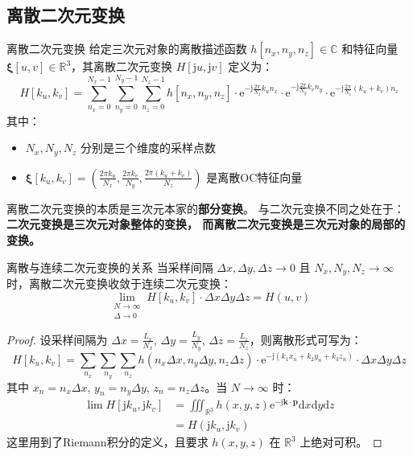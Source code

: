 \documentclass[lang=cn,newtx,10pt,scheme=chinese]{elegantbook}
\newcommand{\md}{\mathrm{d}}
\newcommand{\me}{\mathrm{e}}
\newcommand{\mj}{\mathrm{j}}
\begin{document}
\subsection{离散二次元变换}
\begin{definition}{离散二次元变换}
    给定三次元对象的离散描述函数 $h[n_x,n_y,n_z] \in \mathbb{C}$ 和特征向量 $\bm{\xi}[u,v] \in \mathbb{R}^3$，其离散二次元变换 $H[\mj u, \mj v]$ 定义为：
    \[
        H[k_u, k_v] = \sum_{n_x=0}^{N_x-1} \sum_{n_y=0}^{N_y-1} \sum_{n_z=0}^{N_z-1} h[n_x,n_y,n_z] \cdot \me^{-\mj \frac{2\pi}{N_x} k_u n_x} \cdot \me^{-\mj \frac{2\pi}{N_y} k_v n_y} \cdot \me^{-\mj \frac{2\pi}{N_z} (k_u+k_v) n_z}
    \]
    其中：
    \begin{itemize}
        \item $N_x, N_y, N_z$ 分别是三个维度的采样点数
        \item $\bm{\xi}[k_u,k_v] = \left(\frac{2\pi k_u}{N_x}, \frac{2\pi k_v}{N_y}, \frac{2\pi(k_u+k_v)}{N_z}\right)$ 是离散OC特征向量
    \end{itemize}
\end{definition}

离散二次元变换的本质是三次元本家的\textbf{部分变换}。
与二次元变换不同之处在于：\textbf{二次元变换是三次元对象整体的变换，
    而离散二次元变换是三次元对象的局部的变换。}

\begin{theorem}{离散与连续二次元变换的关系}
    当采样间隔 $\Delta x, \Delta y, \Delta z \to 0$ 且 $N_x, N_y, N_z \to \infty$ 时，离散二次元变换收敛于连续二次元变换：
    \[
        \lim_{\substack{N\to\infty \\ \Delta\to 0}} H[k_u, k_v] \cdot \Delta x \Delta y \Delta z = H(u, v)
    \]
\end{theorem}

\begin{proof}
    设采样间隔为 $\Delta x = \frac{L_x}{N_x}$, $\Delta y = \frac{L_y}{N_y}$, $\Delta z = \frac{L_z}{N_z}$，则离散形式可写为：
    \[
        H[k_u, k_v] = \sum_{n_x} \sum_{n_y} \sum_{n_z} h(n_x\Delta x, n_y\Delta y, n_z\Delta z) \cdot \me^{-\mj (k_1 x_n + k_2 y_n + k_3 z_n)} \cdot \Delta x \Delta y \Delta z
    \]
    其中 $x_n = n_x\Delta x$, $y_n = n_y\Delta y$, $z_n = n_z\Delta z$。当 $N \to \infty$ 时：
    \begin{align*}
        \lim H[\mj k_u, \mj k_v] & = \iiint_{\mathbb{R}^3} h(x,y,z) \me^{-\mj \bm{k}\cdot\bm{p}} \md x \md y \md z \\
                                 & = H(\mj k_u, \mj k_v)
    \end{align*}
    这里用到了Riemann积分的定义，且要求 $h(x,y,z)$ 在 $\mathbb{R}^3$ 上绝对可积。
\end{proof}
\end{document}
